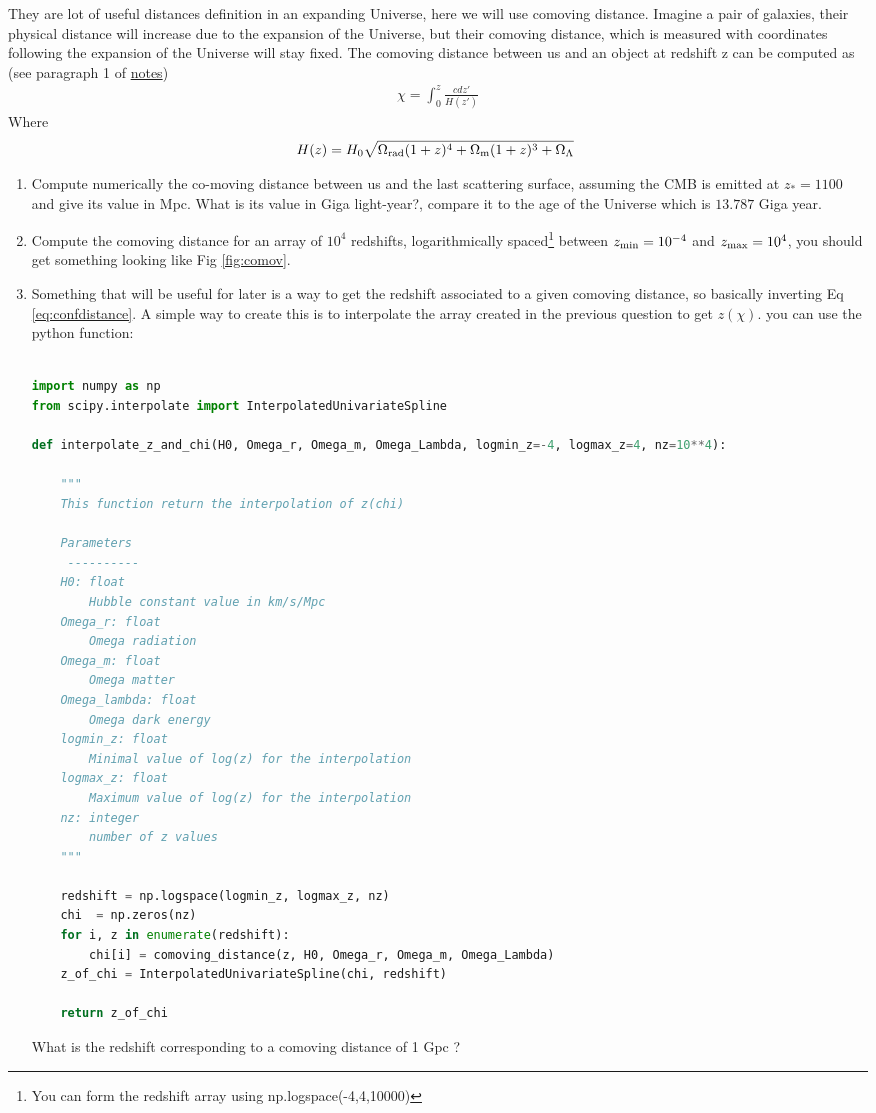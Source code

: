 \documentclass[a4paper, 11pt]{article}
\def\ba{\begin{eqnarray}}
\def\ea{\end{eqnarray}}
\begin{document}
They are lot of useful distances definition in an expanding Universe, here we will use comoving distance. Imagine a pair of galaxies, their physical distance will increase due to the expansion of the Universe, but their comoving distance, which is measured with coordinates following the expansion of the Universe will stay fixed.
The comoving distance between us and an object at redshift z can be computed as  (see paragraph 1 of \href{https://github.com/thibautlouis/thibautlouis.github.io/blob/master/derivation.pdf}{notes})
\ba
\chi  = \int^{z}_{0}  \frac{c dz'}{ H(z')} \label{eq:confdistance}
\ea
Where 
\ba
H(z) = H_{0} \sqrt{ \Omega_{\rm rad}(1+z)^{4} + \Omega_{\rm m}(1+z)^{3} + \Omega_{\Lambda}} 
\ea
\begin{enumerate}
\item Compute numerically the co-moving distance between us and the last scattering surface, assuming the CMB is emitted at $z_{*}=1100$ and give its value in Mpc. What is its value in Giga light-year?, compare it to the age of the Universe which is $13.787$ Giga year.
\item Compute the comoving distance for an array of $10^{4}$ redshifts, logarithmically spaced\footnote{You can form the redshift array using np.logspace(-4,4,10000)}  between $z_{\rm min}=10^{-4}$ and $z_{\rm max}=10^{4}$, you should get something looking like Fig \ref{fig:comov}. 
 \item Something that will be useful for later is a way to get the redshift associated to a given comoving distance, so basically inverting Eq \ref{eq:confdistance}. A simple way to create this is to interpolate the array created in the previous question to get $z(\chi)$. you can use the python function: \\ \\
 
 \begin{lstlisting}[language=Python]
import numpy as np
from scipy.interpolate import InterpolatedUnivariateSpline

def interpolate_z_and_chi(H0, Omega_r, Omega_m, Omega_Lambda, logmin_z=-4, logmax_z=4, nz=10**4):

    """
    This function return the interpolation of z(chi)
    
    Parameters
     ----------
    H0: float
        Hubble constant value in km/s/Mpc
    Omega_r: float
        Omega radiation
    Omega_m: float
        Omega matter
    Omega_lambda: float
        Omega dark energy
    logmin_z: float
        Minimal value of log(z) for the interpolation
    logmax_z: float
        Maximum value of log(z) for the interpolation
    nz: integer
        number of z values
    """

    redshift = np.logspace(logmin_z, logmax_z, nz)
    chi  = np.zeros(nz)
    for i, z in enumerate(redshift):
        chi[i] = comoving_distance(z, H0, Omega_r, Omega_m, Omega_Lambda)
    z_of_chi = InterpolatedUnivariateSpline(chi, redshift)

    return z_of_chi

\end{lstlisting}

What is the redshift corresponding to a comoving distance of 1 Gpc ?
\end{enumerate}
\end{document}

